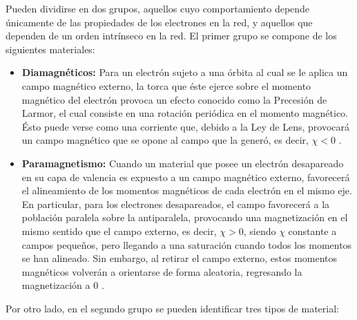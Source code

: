 \documentclass[../main.tex]{subfiles}
\begin{document}
Pueden dividirse en dos grupos, aquellos cuyo comportamiento depende únicamente de las propiedades de los electrones en la red, y aquellos que dependen de un orden intrínseco en la red. El primer grupo se compone de los siguientes materiales:
\begin{itemize}
    \item \textbf{Diamagnéticos:} Para un electrón sujeto a una órbita al cual se le aplica un campo magnético externo, la torca que éste ejerce sobre el momento magnético del electrón provoca un efecto conocido como la Precesión de Larmor, el cual consiste en una rotación periódica en el momento magnético. Ésto puede verse como una corriente que, debido a la Ley de Lens, provocará un campo magnético que se opone al campo que la generó, es decir, $\chi<0$ \cite{coey2010magnetism}.
    \item \textbf{Paramagnetismo:} Cuando un material que posee un electrón desapareado en su capa de valencia es expuesto a un campo magnético externo, favorecerá el alineamiento de los momentos magnéticos de cada electrón en el mismo eje. En particular, para los electrones desapareados, el campo favorecerá a la población paralela sobre la antiparalela, provocando una magnetización en el mismo sentido que el campo externo, es decir, $\chi>0$, siendo $\chi$ constante a campos pequeños, pero llegando a una saturación cuando todos los momentos se han alineado. Sin embargo, al retirar el campo externo, estos momentos magnéticos volverán a orientarse de forma aleatoria, regresando la magnetización a 0 \cite{coey2010magnetism}.
\end{itemize}
Por otro lado, en el segundo grupo se pueden identificar tres tipos de material:
\end{document}
